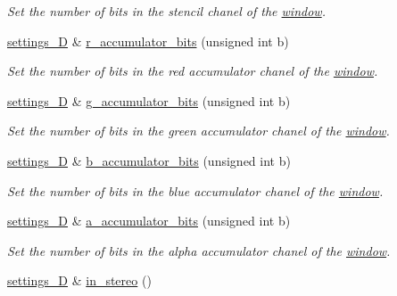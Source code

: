 \begin{DoxyCompactItemize}
\begin{DoxyCompactList}\small\item\em Set the number of bits in the stencil chanel of the \hyperlink{classgfx_1_1window}{window}. \end{DoxyCompactList}\item 
\hyperlink{classgfx_1_1window_1_1settings__3D}{settings\-\_\-D} \& \hyperlink{classgfx_1_1window_1_1settings__3D_a224b04189451a09a04b580520512535c}{r\-\_\-accumulator\-\_\-bits} (unsigned int b)
\begin{DoxyCompactList}\small\item\em Set the number of bits in the red accumulator chanel of the \hyperlink{classgfx_1_1window}{window}. \end{DoxyCompactList}\item 
\hyperlink{classgfx_1_1window_1_1settings__3D}{settings\-\_\-D} \& \hyperlink{classgfx_1_1window_1_1settings__3D_a29ef3cc57b1cbd582909b625073a24d8}{g\-\_\-accumulator\-\_\-bits} (unsigned int b)
\begin{DoxyCompactList}\small\item\em Set the number of bits in the green accumulator chanel of the \hyperlink{classgfx_1_1window}{window}. \end{DoxyCompactList}\item 
\hyperlink{classgfx_1_1window_1_1settings__3D}{settings\-\_\-D} \& \hyperlink{classgfx_1_1window_1_1settings__3D_adc7690753158332f4f7fa943f84a2a4a}{b\-\_\-accumulator\-\_\-bits} (unsigned int b)
\begin{DoxyCompactList}\small\item\em Set the number of bits in the blue accumulator chanel of the \hyperlink{classgfx_1_1window}{window}. \end{DoxyCompactList}\item 
\hyperlink{classgfx_1_1window_1_1settings__3D}{settings\-\_\-D} \& \hyperlink{classgfx_1_1window_1_1settings__3D_aa974222f23d90edfa76915ee823e3826}{a\-\_\-accumulator\-\_\-bits} (unsigned int b)
\begin{DoxyCompactList}\small\item\em Set the number of bits in the alpha accumulator chanel of the \hyperlink{classgfx_1_1window}{window}. \end{DoxyCompactList}\item 
\hypertarget{classgfx_1_1window_1_1settings__3D_a176750a13f57f0110daf01b67737b37d}{\hyperlink{classgfx_1_1window_1_1settings__3D}{settings\-\_\-D} \& \hyperlink{classgfx_1_1window_1_1settings__3D_a176750a13f57f0110daf01b67737b37d}{in\-\_\-stereo} ()}\label{classgfx_1_1window_1_1settings__3D_a176750a13f57f0110daf01b67737b37d}


\end{DoxyCompactItemize}
